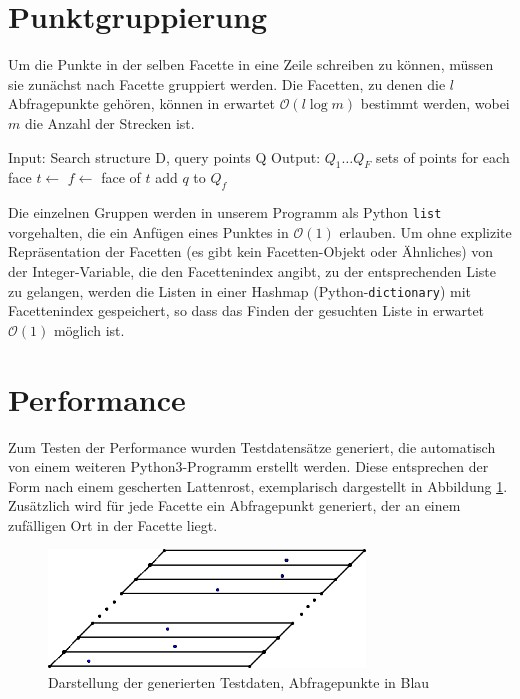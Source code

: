 \documentclass[11pt, a4paper]{article}
\begin{document}
\section{Punktgruppierung}
Um die Punkte in der selben Facette in eine Zeile schreiben zu können, müssen sie zunächst nach Facette gruppiert werden. Die Facetten, zu denen die $l$ Abfragepunkte gehören, können in erwartet $\mathcal{O}(l \log m)$ bestimmt werden, wobei $m$ die Anzahl der Strecken ist.

\begin{algorithmic}[1]
\State Input: Search structure D, query points Q
\State Output: $Q_1 \dots Q_F$ sets of points for each face
		\State $t \gets$ 
		\State $f \gets$ face of $t$
		\State add $q$ to $Q_f$
	\EndFor
\EndFunction
\end{algorithmic}

Die einzelnen Gruppen werden in unserem Programm als Python \texttt{list} vorgehalten, die ein Anfügen eines Punktes in $\mathcal{O}(1)$ erlauben. Um ohne explizite Repräsentation der Facetten (es gibt kein Facetten-Objekt oder Ähnliches) von der Integer-Variable, die den Facettenindex angibt, zu der entsprechenden Liste zu gelangen, werden die Listen in einer Hashmap (Python-\texttt{dictionary}) mit Facettenindex gespeichert, so dass das Finden der gesuchten Liste in erwartet $\mathcal{O}(1)$ möglich ist.

\section{Performance}
Zum Testen der Performance wurden Testdatensätze generiert, die automatisch von einem weiteren Python3-Programm erstellt werden. Diese entsprechen der Form nach einem gescherten Lattenrost, exemplarisch dargestellt in Abbildung \ref{fig:generated_dataset}. Zusätzlich wird für jede Facette ein Abfragepunkt generiert, der an einem zufälligen Ort in der Facette liegt.

\begin{figure}[h!]
	\centering
	\includegraphics[width=0.75\textwidth]{generated_dataset}
	\caption{Darstellung der generierten Testdaten, Abfragepunkte in Blau}
	\label{fig:generated_dataset}
\end{figure}
\end{document}
